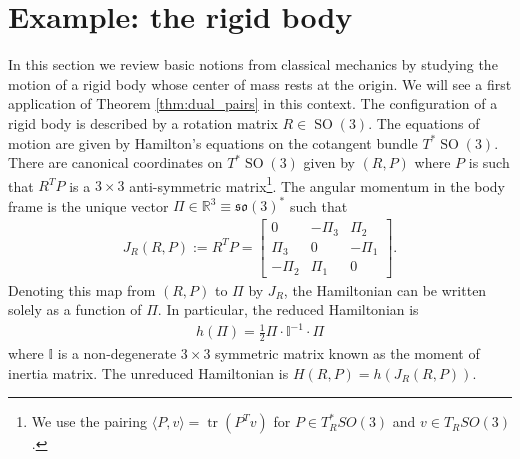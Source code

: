 \documentclass[12pt]{amsart}
\newcommand{\so}{\ensuremath{\mathfrak{so}}}
\DeclareMathOperator{\SO}{SO}
\DeclareMathOperator{\tr}{tr}
\begin{document}
\section{Example: the rigid body}
\label{sec:rigid_body}
  In this section we review basic notions from classical mechanics
by studying the motion of a rigid body whose center of mass rests
at the origin.
We will see a first application of Theorem \ref{thm:dual_pairs}
in this context.
The configuration of a rigid body is described by a
rotation matrix $R \in \SO(3)$.
The equations of motion are given by Hamilton's equations
on the cotangent bundle $T^*\SO(3)$.
There are canonical coordinates on $T^*\SO(3)$ given by $(R,P)$
where $P$ is such that $R^TP $ is a $3 \times 3$ anti-symmetric
matrix\footnote{%
  We use the pairing $\langle P, v \rangle = \tr(P^T v)$ for
  $P \in T^*_R SO(3)$ and $v \in T_R SO(3)$.}.
The angular momentum in the body frame is the
unique vector $\Pi \in \mathbb{R}^3 \equiv \so(3)^*$ such that
\begin{align*}
  J_R(R,P) := R^TP = \begin{bmatrix}
    0 & -\Pi_3 & \Pi_2 \\
    \Pi_3 & 0 & -\Pi_1 \\
    -\Pi_2 & \Pi_1 & 0 
    \end{bmatrix}.
\end{align*}
Denoting this map from $(R,P)$ to $\Pi$ by $J_R$,
the Hamiltonian can be written solely as a function
of $\Pi$.  In particular, the reduced Hamiltonian is
\begin{align*}
  h(\Pi) = \frac{1}{2}\Pi \cdot \mathbb{I}^{-1} \cdot \Pi
\end{align*}
where $\mathbb{I}$ is a non-degenerate $3\times 3$ symmetric matrix
known as the moment of inertia matrix.
The unreduced Hamiltonian is $H(R,P) = h(J_R(R,P))$.
\end{document}
